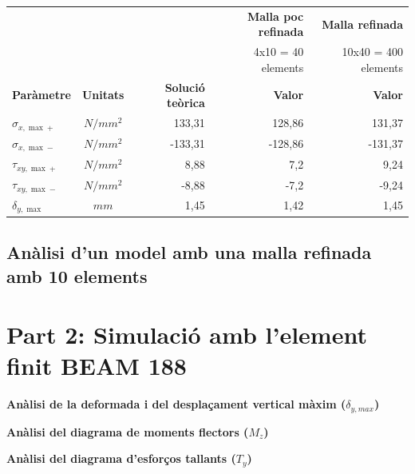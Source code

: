 \documentclass[a4paper]{article}
\begin{document}
\begin{table}[H]
	\centering
	\begin{tabular}{|l|c|r|r|r|}
		\cline{4-5}
		\multicolumn{3}{c|}{\multirow{2}{*}{}} & \textbf{Malla poc refinada} & \textbf{Malla refinada} \\
		\multicolumn{3}{c|}{} & 4x10 = 40 elements & 10x40 = 400 elements \\
		\hline
		\textbf{Paràmetre} & \textbf{Unitats} & \textbf{Solució teòrica} & \textbf{Valor} & \textbf{Valor} \\
		\hline
		$\sigma_{x,\max+}$ & $N/mm^2$ & 133,31 & 128,86 & 131,37 \\
		$\sigma_{x,\max-}$ & $N/mm^2$ & -133,31 & -128,86 & -131,37 \\
		$\tau_{xy,\max+}$ & $N/mm^2$ & 8,88 & 7,2 & 9,24 \\
		$\tau_{xy,\max-}$ & $N/mm^2$ & -8,88 & -7,2 & -9,24 \\
		$\delta_{y,\max}$ & $mm$ & 1,45 & 1,42 & 1,45 \\
		\hline
	\end{tabular}
\end{table}



\subsection{Anàlisi d'un model amb una malla refinada amb 10 elements }

\section{Part 2: Simulació amb l'element finit BEAM 188}
\textbf{Anàlisi de la deformada i del desplaçament vertical màxim ($\delta_{y,max}$)}

\textbf{Anàlisi del diagrama de moments flectors ($M_z$)}

\textbf{Anàlisi del diagrama d'esforços tallants ($T_y$)}
\end{document}
